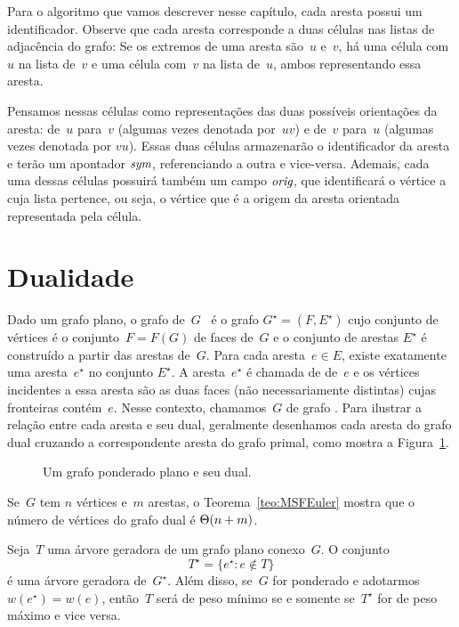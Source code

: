 Para o algoritmo que vamos descrever nesse capítulo, cada aresta possui um identificador.
Observe que cada aresta corresponde a duas células nas listas de adjacência do grafo:
Se os extremos de uma aresta são~$u$ e~$v$, há uma célula com~$u$ na lista de~$v$ e uma célula com~$v$ na lista de~$u$, ambos representando essa aresta.

Pensamos nessas células como representações das duas possíveis orientações da aresta: de~$u$ para~$v$ (algumas vezes denotada por~$uv$) e de~$v$ para~$u$ (algumas vezes denotada por $vu$).
Essas duas células armazenarão o identificador da aresta e terão um apontador $\textit{sym}$, referenciando a outra e vice-versa.
Ademais, cada uma dessas células possuirá também um campo $\textit{orig}$, que identificará o vértice a cuja lista pertence, ou seja, o vértice que é a origem da aresta orientada representada pela célula.

\section{Dualidade}
\label{sec:dualidade}


Dado um grafo plano, o grafo  de~$G$~\cite{Diestel} é o grafo $G^\star = (F,E^\star)$ cujo conjunto de vértices é o conjunto~$F = F(G)$ de faces de~$G$ e o conjunto de arestas $E^\star$ é construído a partir das arestas de~$G$.
Para cada aresta~$e\in E$, existe exatamente uma aresta~$e^\star$ no conjunto $E^\star$.
A aresta~$e^\star$ é chamada de  de~$e$ e os vértices incidentes a essa aresta são as duas faces (não necessariamente distintas) cujas fronteiras contém~$e$.
Nesse contexto, chamamos~$G$ de grafo .
Para ilustrar a relação entre cada aresta e seu dual, geralmente desenhamos cada aresta do grafo dual cruzando a correspondente aresta do grafo primal, como mostra a Figura~\ref{fig:MSF-basico-1}.

\begin{figure}[htb]
\scalebox{1.5}{
\centering

}
\caption{Um grafo ponderado plano e seu dual.}
\label{fig:MSF-basico-1}
\end{figure}


Se~$G$ tem $n$ vértices e~$m$ arestas, o Teorema~\ref{teo:MSFEuler} mostra que o número de vértices do grafo dual é $\Theta(n+m)$.

\begin{theorem}
\label{teo:MSFdual}
Seja~$T$ uma árvore geradora de um grafo plano conexo~$G$. O conjunto
$$
T^\star = \{e^\star:e\notin T\}
$$
é uma árvore geradora de~$G^\star$.
Além disso, se~$G$ for ponderado e adotarmos $w(e^\star) = w(e)$, então~$T$ será de peso mínimo se e somente se~$T^\star$ for de peso máximo e vice versa.
\end{theorem}

